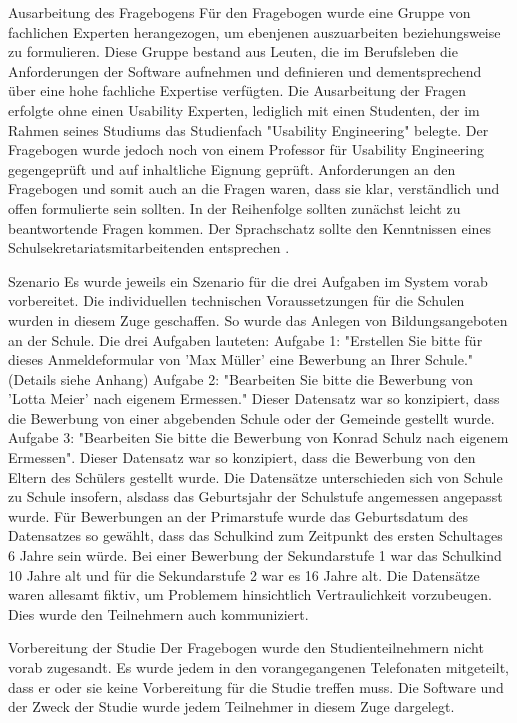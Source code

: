 Ausarbeitung des Fragebogens
Für den Fragebogen wurde eine Gruppe von fachlichen Experten herangezogen, um ebenjenen auszuarbeiten beziehungsweise zu formulieren. Diese Gruppe bestand aus Leuten, die im Berufsleben die Anforderungen der Software aufnehmen und definieren und dementsprechend über eine hohe fachliche Expertise verfügten. Die Ausarbeitung der Fragen erfolgte ohne einen Usability Experten, lediglich mit einen Studenten, der im Rahmen seines Studiums das Studienfach "Usability Engineering" belegte. Der Fragebogen wurde jedoch noch von einem Professor für Usability Engineering gegengeprüft und auf inhaltliche Eignung geprüft. 
Anforderungen an den Fragebogen und somit auch an die Fragen waren, dass sie klar, verständlich und offen formulierte sein sollten. In der Reihenfolge sollten zunächst leicht zu beantwortende Fragen kommen. Der Sprachschatz sollte den Kenntnissen eines Schulsekretariatsmitarbeitenden entsprechen \cite{Kruse_2015}. 

Szenario
Es wurde jeweils ein Szenario für die drei Aufgaben im System vorab vorbereitet. Die individuellen technischen Voraussetzungen für die Schulen wurden in diesem Zuge geschaffen. So wurde das Anlegen von Bildungsangeboten an der Schule. Die drei Aufgaben lauteten:
Aufgabe 1: "Erstellen Sie bitte für dieses Anmeldeformular von 'Max Müller' eine Bewerbung an Ihrer Schule." (Details siehe Anhang)
Aufgabe 2: "Bearbeiten Sie bitte die Bewerbung von 'Lotta Meier' nach eigenem Ermessen." Dieser Datensatz war so konzipiert, dass die Bewerbung von einer abgebenden Schule oder der Gemeinde gestellt wurde.
Aufgabe 3: "Bearbeiten Sie bitte die Bewerbung von Konrad Schulz nach eigenem Ermessen". Dieser Datensatz war so konzipiert, dass die Bewerbung von den Eltern des Schülers gestellt wurde.
Die Datensätze unterschieden sich von Schule zu Schule insofern, alsdass das Geburtsjahr der Schulstufe angemessen angepasst wurde. Für Bewerbungen an der Primarstufe wurde das Geburtsdatum des Datensatzes so gewählt, dass das Schulkind zum Zeitpunkt des ersten Schultages 6 Jahre sein würde. Bei einer Bewerbung der Sekundarstufe 1 war das Schulkind 10 Jahre alt und für die Sekundarstufe 2 war es 16 Jahre alt. Die Datensätze waren allesamt fiktiv, um Problemem hinsichtlich Vertraulichkeit vorzubeugen. Dies wurde den Teilnehmern auch kommuniziert.

Vorbereitung der Studie 
Der Fragebogen wurde den Studienteilnehmern nicht vorab zugesandt. Es wurde jedem in den vorangegangenen Telefonaten mitgeteilt, dass er oder sie keine Vorbereitung für die Studie treffen muss. Die Software und der Zweck der Studie wurde jedem Teilnehmer in diesem Zuge dargelegt.

